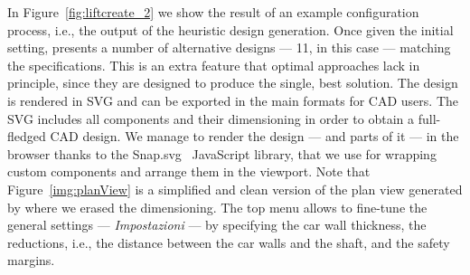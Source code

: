 In Figure~\ref{fig:liftcreate_2} we show the result of an example configuration
process, i.e., the output of the heuristic design generation. Once given the initial 
setting, \liftcreate{} presents a number of alternative designs --- 11, in this 
case --- matching the specifications. This is an extra feature that optimal 
approaches lack in principle, since they are designed to produce the single, 
best solution. The design is rendered in SVG and can be exported in the main 
formats for CAD users. The SVG includes all components and their dimensioning
in order to obtain a full-fledged CAD design. We manage to render the 
design --- and parts of it --- in the browser thanks to the Snap.svg~\cite{snap}
JavaScript library, that we use for wrapping custom components and arrange
them in the viewport. Note that Figure~\ref{img:planView} is a simplified and
clean version of the plan view generated by \liftcreate{} where we erased the
dimensioning. The top menu allows to fine-tune the general settings --- 
\textit{Impostazioni} --- by specifying the car wall thickness, the reductions,
i.e., the distance between the car walls and the shaft, and the safety margins.